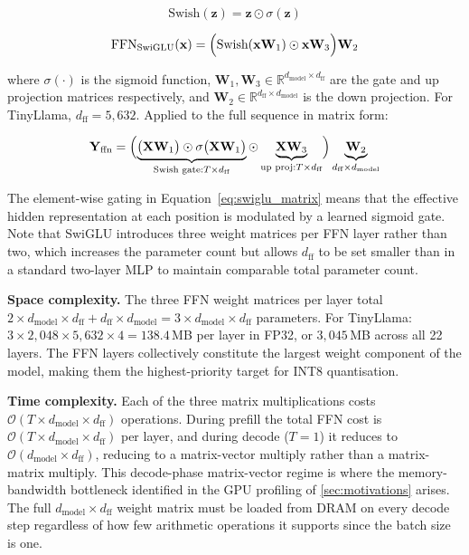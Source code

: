\begin{equation}
  \text{Swish}(\mathbf{z}) = \mathbf{z} \odot \sigma(\mathbf{z})
  \label{eq:swish}
\end{equation}

\begin{equation}
  \text{FFN}_{\text{SwiGLU}}(\mathbf{x})
  = \Bigl(\text{Swish}(\mathbf{x}\mathbf{W}_1) \odot \mathbf{x}\mathbf{W}_3\Bigr)
    \mathbf{W}_2
  \label{eq:swiglu}
\end{equation}

\noindent where $\sigma(\cdot)$ is the sigmoid function,
$\mathbf{W}_1, \mathbf{W}_3 \in \mathbb{R}^{d_{\text{model}} \times
d_{\text{ff}}}$ are the gate and up projection matrices respectively, and
$\mathbf{W}_2 \in \mathbb{R}^{d_{\text{ff}} \times d_{\text{model}}}$ is
the down projection. For TinyLlama, $d_{\text{ff}} = 5{,}632$. Applied to
the full sequence in matrix form:

\begin{equation}
  \mathbf{Y}_{\text{ffn}}
  = \Bigl(
      \underbrace{
        \bigl(\mathbf{X}\mathbf{W}_1\bigr)
        \odot \sigma\bigl(\mathbf{X}\mathbf{W}_1\bigr)
      }_{\text{Swish gate}: T \times d_{\text{ff}}}
      \odot
      \underbrace{
        \mathbf{X}\mathbf{W}_3
      }_{\text{up proj}: T \times d_{\text{ff}}}
    \Bigr)
    \underbrace{
      \mathbf{W}_2
    }_{d_{\text{ff}} \times d_{\text{model}}}
  \label{eq:swiglu_matrix}
\end{equation}

The element-wise gating in Equation~\ref{eq:swiglu_matrix} means that
the effective hidden representation at each position is modulated by a
learned sigmoid gate. Note that SwiGLU introduces three weight matrices per FFN layer rather than
two, which increases the parameter count but allows $d_{\text{ff}}$ to be
set smaller than in a standard two-layer MLP to maintain comparable total
parameter count.

\noindent\textbf{Space complexity.} The three FFN weight matrices per layer
total $2 \times d_{\text{model}} \times d_{\text{ff}} + d_{\text{ff}}
\times d_{\text{model}} = 3 \times d_{\text{model}} \times d_{\text{ff}}$
parameters. For TinyLlama: $3 \times 2{,}048 \times 5{,}632 \times 4
= 138.4$\,MB per layer in FP32, or $3{,}045$\,MB across all 22 layers.
The FFN layers collectively constitute the largest weight component of the
model, making them the highest-priority target for INT8 quantisation.

\noindent\textbf{Time complexity.} Each of the three matrix multiplications
costs $\mathcal{O}(T \times d_{\text{model}} \times d_{\text{ff}})$
operations. During prefill the total FFN cost is
$\mathcal{O}(T \times d_{\text{model}} \times d_{\text{ff}})$ per layer,
and during decode ($T = 1$) it reduces to
$\mathcal{O}(d_{\text{model}} \times d_{\text{ff}})$, reducing to a
matrix-vector multiply rather than a matrix-matrix multiply. This decode-phase
matrix-vector regime is where the memory-bandwidth bottleneck
identified in the GPU profiling of \cref{sec:motivations} arises. The full
$d_{\text{model}} \times d_{\text{ff}}$ weight matrix must be loaded from
DRAM on every decode step regardless of how few arithmetic operations it
supports since the batch size is one.

